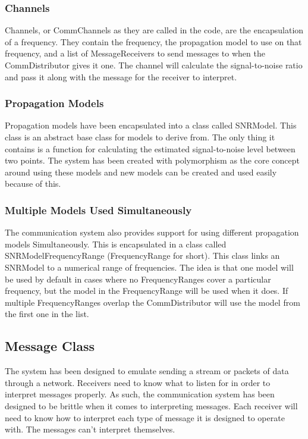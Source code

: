 \documentclass[../main.tex]{subfiles}
\begin{document}
\subsubsection{Channels}
Channels, or CommChannels as they are called in the code, are the encapsulation of a frequency.
They contain the frequency, the propagation model to use on that frequency, and a list of MessageReceivers to send messages to when the CommDistributor gives it one.
The channel will calculate the signal-to-noise ratio and pass it along with the message for the receiver to interpret.

\subsubsection{Propagation Models}
Propagation models have been encapsulated into a class called SNRModel.
This class is an abstract base class for models to derive from.
The only thing it contains is a function for calculating the estimated signal-to-noise level between two points.
The system has been created with polymorphism as the core concept around using these models and new models can be created and used easily because of this.

\subsubsection{Multiple Models Used Simultaneously}
The communication system also provides support for using different propagation models Simultaneously.
This is encapsulated in a class called SNRModelFrequencyRange (FrequencyRange for short).
This class links an SNRModel to a numerical range of frequencies.
The idea is that one model will be used by default in cases where no FrequencyRanges cover a particular frequency, but the model in the FrequencyRange will be used when it does.
If multiple FrequencyRanges overlap the CommDistributor will use the model from the first one in the list.

\subsection{Message Class}
The system has been designed to emulate sending a stream or packets of data through a network.
Receivers need to know what to listen for in order to interpret messages properly.
As such, the communication system has been designed to be brittle when it comes to interpreting messages.
Each receiver will need to know how to interpret each type of message it is designed to operate with.
The messages can't interpret themselves.
\end{document}
